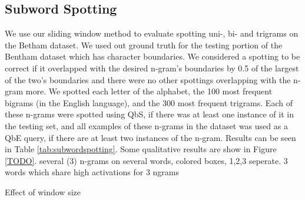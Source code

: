 \documentclass[ms,electronic,twosidetoc,letterpaper,chaptercenter,parttop,lol,lof,lot]{byumsphd}
\begin{document}
\subsection{Subword Spotting}

We use our sliding window method to evaluate spotting uni-, bi- and trigrams on the Betham dataset. We used out ground truth for the testing portion of the Bentham dataset which has character boundaries. We considered a spotting to be correct if it overlapped with the desired n-gram's boundaries by 0.5 of the largest of the two's boundaries and there were no other spottings overlapping with the n-gram more. 
We spotted each letter of the alphabet, the 100 most frequent bigrams (in the English language), and the 300 most frequent trigrams. Each of these n-grams were spotted using QbS, if there was at least one instance of it in the testing set, and all examples of these n-grams in the dataset was used as a QbE query, if there are at least two instances of the n-gram.
Results can be seen in Table \ref{tab:subwordspotting}.
Some qualitative results are show in Figure \ref{TODO}. several (3) n-grams on several words, colored boxes, 1,2,3 seperate. 3 words which share high activations for 3 ngrams

Effect of window size %



\end{document}
